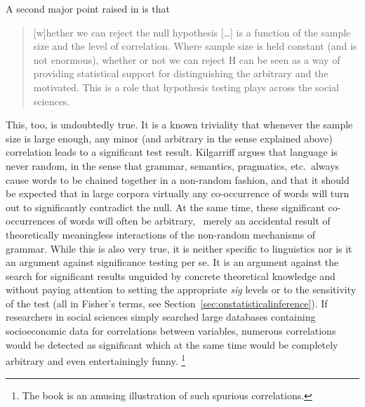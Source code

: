 A second major point raised in \citet[266]{Kilgarriff2005} is that

\begin{quote}
  [w]hether we can reject the null hypothesis [\ldots] is a function of the sample size and the level of correlation.
Where sample size is held constant (and is not enormous), whether or not we can reject H can be seen as a way of providing statistical support for distinguishing the arbitrary and the motivated.
This is a role that hypothesis testing plays across the social sciences.
\end{quote}

This, too, is undoubtedly true.
It is a known triviality that whenever the sample size is large enough, any minor (and arbitrary in the sense explained above) correlation leads to a significant test result.
Kilgarriff argues that language is never random, in the sense that grammar, semantics, pragmatics, etc.\ always cause words to be chained together in a non-random fashion, and that it should be expected that in large corpora virtually any co-occurrence of words will turn out to significantly contradict the null.
At the same time, these significant co-occurrences of words will often be arbitrary, \ie\ merely an accidental result of theoretically meaningless interactions of the non-random mechanisms of grammar.
While this is also very true, it is neither specific to linguistics nor is it an argument against significance testing per se.
It is an argument against the search for significant results unguided by concrete theoretical knowledge and without paying attention to setting the appropriate \textit{sig} levels or to the sensitivity of the test (all in Fisher's terms, see Section~\ref{sec:onstatisticalinference}).
If researchers in social sciences simply searched large databases containing socioeconomic data for correlations between variables, numerous correlations would be detected as significant which at the same time would be completely arbitrary and even entertainingly funny.%
\footnote{The book \citet{Vigen2015} is an amusing illustration of such spurious correlations.}

